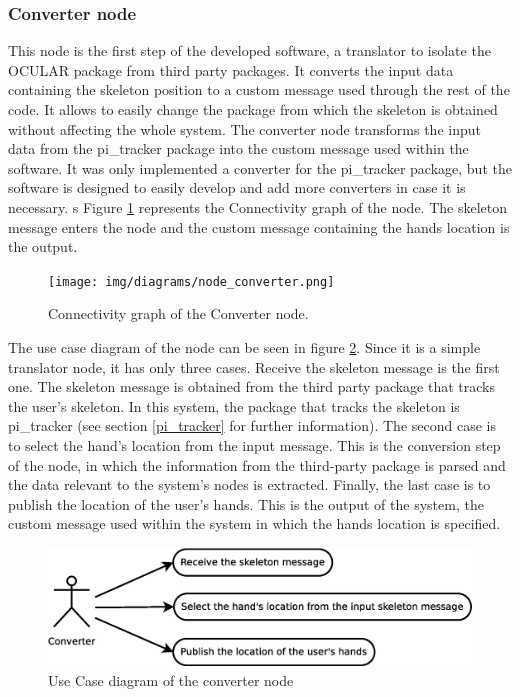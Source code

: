 




\subsubsection{Converter node}
		\label{converter}

	This node is the first step of the developed software, a translator to isolate the OCULAR package from third party packages. 
	It converts the input data containing the skeleton position to a custom message used through the rest of the code. 
	It allows to easily change the package from which the skeleton is obtained without affecting the whole system. 
	The converter node transforms the input data from the pi\_tracker package into the custom message used within the software. 
	It was only implemented a converter for the pi\_tracker package, but the software is designed to easily develop and add more converters in case it is necessary. s
	Figure \ref{converter_graph} represents the Connectivity graph of the node. 
	The skeleton message enters the node and the custom message containing the hands location is the output. 

		\begin{figure}[H]
			\centering
			\texttt{[image: img/diagrams/node\_converter.png]}
			\caption[Converter node I/O]{Connectivity graph of the Converter node.}		
			\label{converter_graph}
		\end{figure}

	The use case diagram of the node can be seen in figure \ref{uc_converter}. 
	Since it is a simple translator node, it has only three cases. 
	Receive the skeleton message is the first one. 
	The skeleton message is obtained from the third party package that tracks the user's skeleton.
	In this system, the package that tracks the skeleton is pi\_tracker (see section \ref{pi_tracker} for further information). 
	The second case is to select the hand's location from the input message. 
	This is the conversion step of the node, in which the information from the third-party package is parsed and the data relevant to the system's nodes is extracted. 
	Finally, the last case is to publish the location of the user's hands. 
	This is the output of the system, the custom message used within the system in which the hands location is specified. 
	\begin{figure}[H]
		\centering
		\includegraphics[scale=0.4]{img/diagrams/uc_converter.eps}
		\caption[Use case diagram converter node]{Use Case diagram of the converter node}
		\label{uc_converter}
	\end{figure}

